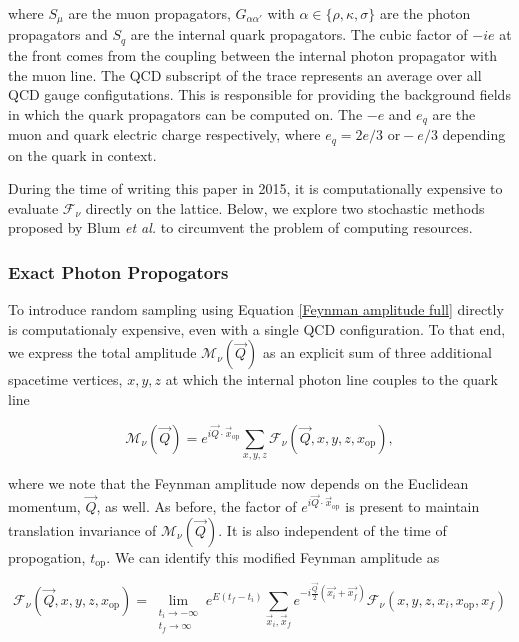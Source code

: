 \documentclass{article}
\numberwithin{equation}{section} %
\begin{document}
\noindent where $S_\mu$ are the muon propagators, $G_{\alpha \alpha '}$ with $\alpha \in \{\rho,\kappa,\sigma \}$ are the photon propagators and $S_q$ are the internal quark propagators. The cubic factor of $-ie$ at the front comes from the coupling between the internal photon propagator with the muon line. The QCD subscript of the trace represents an average over all QCD gauge configutations. This is responsible for providing the background fields in which the quark propagators can be computed on. The $-e$ and $e_q$ are the muon and quark electric charge respectively, where $e_q = 2e/3 \, \, \mathrm{or} -e/3$ depending on the quark in context.  

During the time of writing this paper \cite{blum} in 2015, it is computationally expensive to evaluate $\mathcal{F}_\nu$ directly on the lattice. Below, we explore two stochastic methods proposed by Blum \textit{et al.} to circumvent the problem of computing resources.

\subsubsection{Exact Photon Propogators}

To introduce random sampling using Equation \ref{Feynman amplitude full} directly is computationaly expensive, even with a single QCD configuration. To that end, we express the total amplitude $\mathcal{M}_\nu(\vec{Q})$ as an explicit sum of three additional spacetime vertices, $x,y,z$ at which the internal photon line couples to the quark line 

\begin{equation}
\mathcal{M}_\nu(\vec{Q}) = e^{i\vec{Q}\cdot\vec{x}_\mathrm{op}} \sum_{x,y,z} \mathcal{F}_\nu(\vec{Q},x,y,z,x_\mathrm{op}),
\label{total amplitude with spacetime}
\end{equation}

\noindent where we note that the Feynman amplitude now depends on the Euclidean momentum, $\vec{Q}$, as well. As before, the factor of $e^{i\vec{Q}\cdot\vec{x}_\mathrm{op}}$ is present to maintain translation invariance of $\mathcal{M}_\nu(\vec{Q})$. It is also independent of the time of propogation, $t_\mathrm{op}$. We can identify this modified Feynman amplitude as 

\begin{equation}
\mathcal{F}_\nu(\vec{Q},x,y,z,x_\mathrm{op}) = \lim_{\substack{t_i\rightarrow -\infty\\t_f \rightarrow \infty}} e^{E(t_f-t_i)} \sum_{\vec{x}_i,\vec{x}_f}e^{-i\frac{\vec{Q}}{2}(\vec{x_i}+\vec{x_f})} \mathcal{F}_\nu(x,y,z,x_i,x_\mathrm{op}, x_f)
\end{equation}
\end{document}
